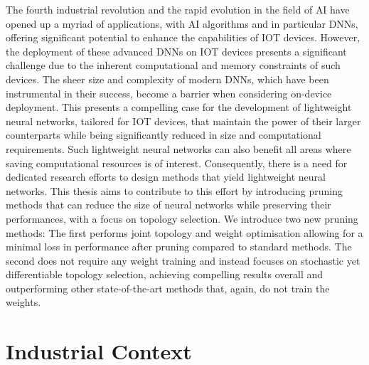 The fourth industrial revolution and the rapid evolution in the field of \ac{AI}
have opened up a myriad of applications, with \ac{AI} algorithms and in
particular \acp{DNN}, offering significant potential to enhance the capabilities
of \ac{IOT} devices. However, the deployment of these advanced \acp{DNN} on
\ac{IOT} devices presents a significant challenge due to the inherent
computational and memory constraints of such devices. The sheer size and
complexity of modern \acp{DNN}, which have been instrumental in their success,
become a barrier when considering on-device deployment. This presents a
compelling case for the development of lightweight neural networks, tailored for
\ac{IOT} devices, that maintain the power of their larger counterparts while
being significantly reduced in size and computational requirements. Such
lightweight neural networks can also benefit all areas where saving
computational resources is of interest. Consequently, there is a need for
dedicated research efforts to design methods that yield lightweight neural
networks. This thesis aims to contribute to this effort by introducing pruning
methods that can reduce the size of neural networks while preserving their
performances, with a focus on topology selection. We introduce two new pruning
methods: The first performs joint topology and weight optimisation allowing for
a minimal loss in performance after pruning compared to standard methods. The
second \DIFdelbegin {}\DIFdelend \DIFaddbegin {}\DIFaddend does not require any weight training and instead focuses on
stochastic yet differentiable topology selection, achieving compelling results
overall and outperforming other \DIFaddbegin {}\DIFaddend state-of-the-art methods that, again, do
not train the weights.

\section{Industrial Context}


